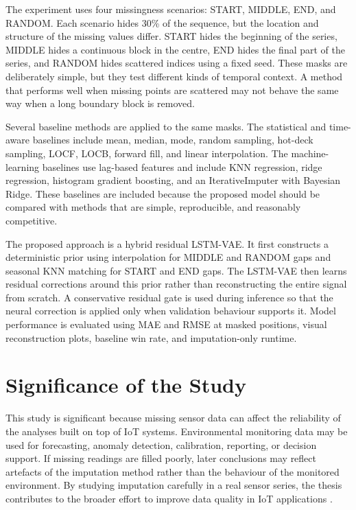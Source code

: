 The experiment uses four missingness scenarios: START, MIDDLE, END, and RANDOM. Each scenario hides 30\% of the sequence, but the location and structure of the missing values differ. START hides the beginning of the series, MIDDLE hides a continuous block in the centre, END hides the final part of the series, and RANDOM hides scattered indices using a fixed seed. These masks are deliberately simple, but they test different kinds of temporal context. A method that performs well when missing points are scattered may not behave the same way when a long boundary block is removed.

Several baseline methods are applied to the same masks. The statistical and time-aware baselines include mean, median, mode, random sampling, hot-deck sampling, LOCF, LOCB, forward fill, and linear interpolation. The machine-learning baselines use lag-based features and include KNN regression, ridge regression, histogram gradient boosting, and an IterativeImputer with Bayesian Ridge. These baselines are included because the proposed model should be compared with methods that are simple, reproducible, and reasonably competitive.

The proposed approach is a hybrid residual LSTM-VAE. It first constructs a deterministic prior using interpolation for MIDDLE and RANDOM gaps and seasonal KNN matching for START and END gaps. The LSTM-VAE then learns residual corrections around this prior rather than reconstructing the entire signal from scratch. A conservative residual gate is used during inference so that the neural correction is applied only when validation behaviour supports it. Model performance is evaluated using MAE and RMSE at masked positions, visual reconstruction plots, baseline win rate, and imputation-only runtime.

\section{Significance of the Study}
This study is significant because missing sensor data can affect the reliability of the analyses built on top of IoT systems. Environmental monitoring data may be used for forecasting, anomaly detection, calibration, reporting, or decision support. If missing readings are filled poorly, later conclusions may reflect artefacts of the imputation method rather than the behaviour of the monitored environment. By studying imputation carefully in a real sensor series, the thesis contributes to the broader effort to improve data quality in IoT applications \cite{Agbo2022MissingDI,Osman2018ASO,Alwateer2024MissingDI}.

